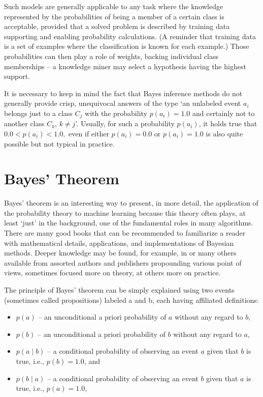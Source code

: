 Such models are generally applicable to any task where the knowledge represented by the probabilities of being a member of a certain class is acceptable,
provided that a solved problem is described by training data supporting and enabling probability calculations. (A reminder that training data is a set of examples where the classification is known for each example.) Those probabilities can
then play a role of weights, backing individual class memberships – a knowledge
miner may select a hypothesis having the highest support.

It is necessary to keep in mind the fact that Bayes inference methods do not
generally provide crisp, unequivocal answers of the type 
‘an unlabeled event $a_i$ belongs just to a class $C_j$ with the probability 
$p(a_i) = 1.0$ and certainly not to another class $C_{k}$, $k \neq j$’. 
Usually, for such a probability $p(a_i)$, it holds true that
$
0.0 < p(a_i) < 1.0,
$
even if either $p(a_i) = 0.0$ or $p(a_i) = 1.0$ is also quite possible
but not typical in practice.

\section{Bayes' Theorem}

Bayes’ theorem is an interesting way to present, in more detail, the application
of the probability theory to machine learning because this theory often plays, at
least ‘just’ in the background, one of the fundamental roles in many algorithms.
There are many good books that can be recommended to familiarize a reader with
mathematical details, applications, and implementations of Bayesian methods.
Deeper knowledge may be found, for example, in \cite{ref23, ref100, ref160, ref191, ref129, ref29} or
many others available from assorted authors and publishers propounding various
point of views, sometimes focused more on theory, at others more on practice.

The principle of Bayes’ theorem can be simply explained using two events
(sometimes called propositions) labeled a and b, each having affiliated definitions:

\begin{itemize}
    \item $p(a)$ – an unconditional a priori probability of $a$ without any regard to $b$,

    \item $p(b)$ – an unconditional a priori probability of $b$ without any regard to $a$,

    \item $p(a \mid b)$ – a conditional probability of observing an event $a$ given that $b$ is true, i.e., $p(b) = 1.0$, and

    \item $p(b \mid a)$ – a conditional probability of observing an event $b$ given that $a$ is true, i.e., $p(a) = 1.0$,
\end{itemize}

